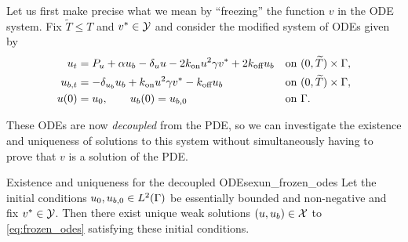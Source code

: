 Let us first make precise what we mean by ``freezing'' the function $v$ in the ODE system. Fix $\widetilde{T} \leq T$ and $v^* \in \mathcal{Y}$ and consider the modified system of ODEs given by
%
\begin{equation}\label{eq:frozen_odes}
    \begin{aligned}
        u_t         &= P_u + \alpha u_b - \delta_u u - 2 k_\text{on} u^2 \gamma v^* + 2 k_\text{off} u_b   & \text{on }& (0, \widetilde{T}) \times \Gamma, \\
        u_{b,t}     &= - \delta_{u_b} u_b + k_\text{on} u^2 \gamma v^* - k_\text{off} u_b                  & \text{on }& (0, \widetilde{T}) \times \Gamma, \\
        u(0)        &= u_0, \qquad u_b(0) = u_{b, 0}                                  & \text{on }& \Gamma. \\
    \end{aligned}
\end{equation}

\noindent
These ODEs are now \emph{decoupled} from the PDE, so we can investigate the existence and uniqueness of solutions to this system without simultaneously having to prove that $v$ is a solution of the PDE.

\begin{lemma}{Existence and uniqueness for the decoupled ODEs}{exun_frozen_odes}
    Let the initial conditions $u_0, u_{b,0} \in L^2(\Gamma)$ be essentially bounded and non-negative and fix $v^* \in \mathcal{Y}$. Then there exist unique weak solutions $(u, u_b) \in \mathcal{X}$ to \cref{eq:frozen_odes} satisfying these initial conditions.
\end{lemma}


